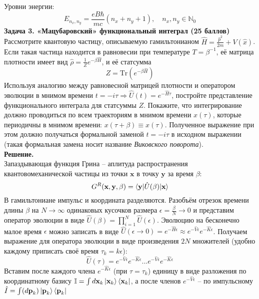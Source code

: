 \documentclass[12pt]{article}
\theoremstyle{definition}
\begin{document}
Уровни энергии:
\begin{equation}
    E_{n_x,n_y}=\frac{eB\hbar}{mc}(n_x+n_y+1),\quad n_x,n_y\in\mathbb{N}_0
\end{equation}
\textbf{Задача 3. «Мацубаровский» функциональный интеграл (25 баллов)}\\
Рассмотрите квантовую частицу, описываемую гамильтонианом $\hat{H}=\frac{\hat{p}^2}{2m} + V(\hat{x})$. Если такая частица находится в равновесии при температуре $T = \beta^{-1}$, её матрица плотности имеет вид $\hat{\rho}=\frac{1}{Z}e^{-\beta\hat{H}}$, и её статсумма
\begin{equation}
    Z = \text{Tr}(e^{-\beta\hat{H}})
\end{equation}
Используя аналогию между равновесной матрицей плотности и оператором эволюции в мнимом времени $t = -i\tau\Rightarrow\hat{U}(t) = e^{-\hat{H}\tau}$, постройте представление функционального интеграла для статсуммы $Z$. Покажите, что интегрирование должно проводиться по всем траекториям в мнимом времени $x(\tau)$, которые периодичны в мнимом времени: $x(\tau+\beta)\equiv x(\tau)$. Полученное выражение при этом должно получаться формальной заменой $t = -i\tau$ в исходном выражении (такая формальная замена носит название \textit{Виковского поворота}).\\
\textbf{Решение.}\\
Запаздывающая функция Грина -- аплитуда распространения квантовомеханической частицы из точки $\textbf{x}$ в точку $\textbf{y}$ за время $\beta$:
\begin{equation}
    G^R(\textbf{x},\textbf{y},\beta)=\braket{\textbf{y}|\hat{U}(\beta)|\textbf{x}}
\end{equation}
В гамильтониане импульс и координата разделяются. Разобъём отрезок времени длины $\beta$ на $N\rightarrow\infty$ одинаковых кусочков размера $\epsilon=\frac{\beta}{N}\rightarrow0$ и представим оператор эволюции в виде $\hat{U}(\beta)=\prod\limits_{i=1}^N\hat{U}(\epsilon)$. Эволюцию на бесконечно малое время $\epsilon$ можно записать в виде $\hat{U}(\epsilon\rightarrow0)=e^{-\hat{H}\epsilon}\approx e^{-\hat{V}\epsilon}e^{-\hat{K}\epsilon}$. Получаем выражение для оператора эволюции в виде произведения $2N$ множителей (удобно каждому приписать своё время $\tau_k=k\epsilon$):
\begin{equation}
    \hat{U}(\tau)=e^{-\hat{V}\epsilon}e^{-\hat{K}\epsilon}...e^{-\hat{V}\epsilon}e^{-\hat{K}\epsilon}
\end{equation}
Вставим после каждого члена $e^{-\hat{K}\epsilon}$ (при $\tau=\tau_k$) единицу в виде разложения по координатному базису $\mathbb{I}=\int d\textbf{x}_k\ket{\textbf{x}_k}\bra{\textbf{x}_k}$, а после членов $e^{-\hat{V}\epsilon}$ -- по импульсному $\hat{I}=\int(d\textbf{p}_k)\ket{\textbf{p}_k}\bra{\textbf{p}_k}$
\end{document}
